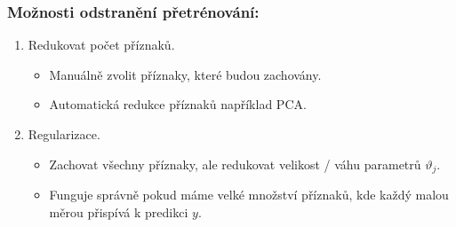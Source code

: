 \subsubsection*{Možnosti odstranění přetrénování:}
\begin{enumerate}
	\item Redukovat počet příznaků.
		\begin{itemize}
			\item Manuálně zvolit příznaky, které budou zachovány.
			\item Automatická redukce příznaků například PCA.
		\end{itemize}
	\item Regularizace.
		\begin{itemize}
			\item Zachovat všechny příznaky, ale redukovat velikost / váhu parametrů $\vartheta_j$.
			\item Funguje správně pokud máme velké množství příznaků, kde každý malou měrou přispívá k predikci $y$.
		\end{itemize}				
\end{enumerate}



\newpage

















